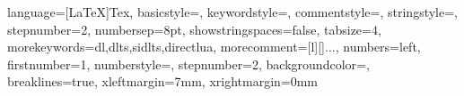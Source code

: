 
 {language={[LaTeX]Tex},
basicstyle=\small\ttfamily,             %
keywordstyle=\color{RoyalBlue},%
commentstyle=\color{Green}\ttfamily,
stringstyle=\rmfamily,
stepnumber=2,
numbersep=8pt,
showstringspaces=false,
	tabsize=4,                              %
	morekeywords={dl,dlts,sidlts,directlua},
	morecomment=[l][\color{Blue}]{...},     %
	numbers=left,                           %
	firstnumber=1,                          %
	numberstyle=\tiny,          %
	stepnumber=2,                            %
	backgroundcolor=\color{red!8},
	breaklines=true,
	xleftmargin=7mm,
	xrightmargin=0mm
}

